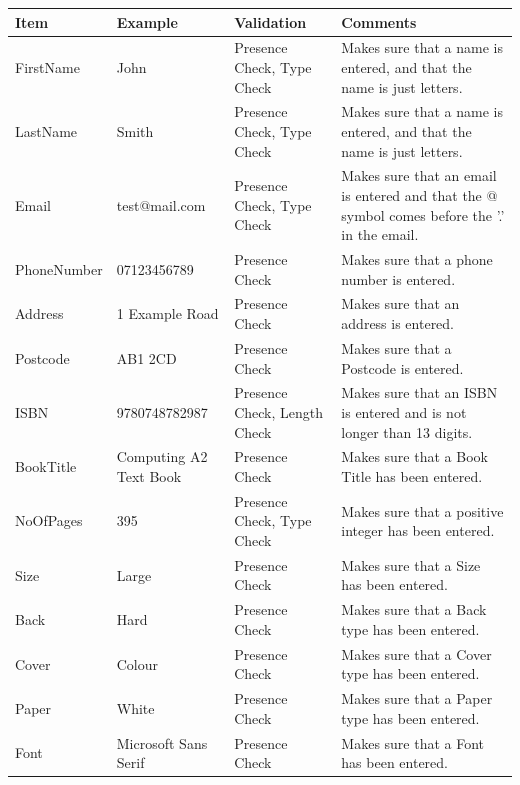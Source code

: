 \begin{center}
    \begin{tabular}{|p{2cm}|p{2cm}|p{2cm}|p{3cm}|}
    \hline
    \textbf{Item} & \textbf{Example} & \textbf{Validation} & \textbf{Comments}\\ \hline
    FirstName & John & Presence Check, Type Check & Makes sure that a name is entered, and that the name is just letters. \\ \hline
    LastName & Smith & Presence Check, Type Check & Makes sure that a name is entered, and that the name is just letters. \\ \hline
    Email & test@mail.com & Presence Check, Type Check & Makes sure that an email is entered and that the @ symbol comes before the '.' in the email. \\ \hline
    PhoneNumber & 07123456789 & Presence Check & Makes sure that a phone number is entered. \\ \hline
    Address & 1 Example Road & Presence Check & Makes sure that an address is entered. \\ \hline
    Postcode & AB1 2CD & Presence Check & Makes sure that a Postcode is entered. \\ \hline
    ISBN & 9780748782987 & Presence Check, Length Check & Makes sure that an ISBN is entered and is not longer than 13 digits. \\ \hline
    BookTitle & Computing A2 Text Book & Presence Check & Makes sure that a Book Title has been entered. \\ \hline
    NoOfPages & 395 & Presence Check, Type Check & Makes sure that a positive integer has been entered. \\ \hline
    Size & Large & Presence Check & Makes sure that a Size has been entered. \\ \hline
    Back & Hard & Presence Check & Makes sure that a Back type has been entered. \\ \hline
    Cover & Colour & Presence Check & Makes sure that a Cover type has been entered. \\ \hline
    Paper & White & Presence Check & Makes sure that a Paper type has been entered. \\ \hline
    Font & Microsoft Sans Serif & Presence Check & Makes sure that a Font has been entered. \\ \hline
\end{tabular}
\end{center}

